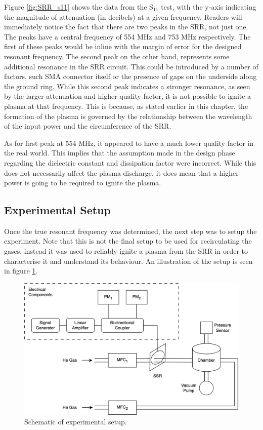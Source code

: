 Figure \ref{fig:SRR_s11} shows the data from the S$_{11}$ test, with the y-axis indicating the magnitude of attenuation (in decibels) at a given frequency. Readers will immediately notice the fact that there are two peaks in the SRR, not just one. The peaks have a central frequency of 554 MHz and 753 MHz respectively. The first of these peaks would be inline with the margin of error for the designed resonant frequency. The second peak on the other hand, represents some additional resonance in the SRR circuit. This could be introduced by a number of factors, such SMA connector itself or the presence of gaps on the underside along the ground ring. While this second peak indicates a stronger resonance, as seen by the larger attenuation and higher quality factor, it is not possible to ignite a plasma at that frequency. This is because, as stated earlier in this chapter, the formation of the plasma is governed by the relationship between the wavelength of the input power and the circumference of the SRR.

As for first peak at 554 MHz, it appeared to have a much lower quality factor in the real world. This implies that the assumption made in the design phase regarding the dielectric constant and dissipation factor were incorrect. While this does not necessarily affect the plasma discharge, it does mean that a higher power is going to be required to ignite the plasma.

\subsection{Experimental Setup}

Once the true resonant frequency was determined, the next step was to setup the experiment. Note that this is not the final setup to be used for recirculating the gases, instead it was used to reliably ignite a plasma from the SRR in order to characterise it and understand its behaviour. An illustration of the setup is seen in figure \ref{fig:SRR_setup}.

\begin{figure}[h!]
	\centering
	\includegraphics[width=\linewidth]{chapter_4/figures/SRR_setup.png}
	\caption{Schematic of experimental setup.}
	\label{fig:SRR_setup}
\end{figure}

